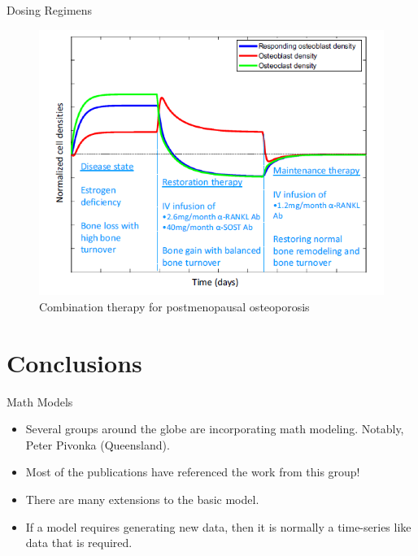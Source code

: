 \documentclass{beamer}
\begin{document}
\begin{frame}{Dosing Regimens}
\begin{figure}[h]
	\centering
		\includegraphics[scale=0.45]{../Figures/fig_lemaire_fig18.png}
	\caption{Combination therapy for postmenopausal osteoporosis}
\end{figure}		
\end{frame}

\section{Conclusions}

\begin{frame}{Math Models}
	\begin{itemize}
		\item Several groups around the globe are incorporating math modeling. Notably, Peter Pivonka (Queensland).
		\item Most of the publications have referenced the work from this group!
		\item There are many extensions to the basic model. 
		\item If a model requires generating new data, then it is normally a  time-series like data that is required.
	\end{itemize}
\end{frame}
\end{document}
